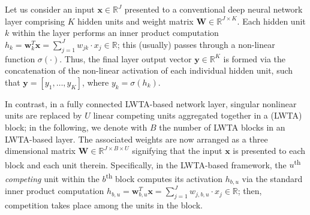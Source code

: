 \documentclass{article}
\begin{document}
	
	Let us consider an input $\boldsymbol x\in \mathbb{R}^{J}$ presented to a conventional deep neural network layer comprising $K$ hidden units and weight matrix $\boldsymbol W \in \mathbb{R}^{J \times K}$. Each hidden unit $k$ within the layer performs an inner product computation $h_k=\boldsymbol w_k^T \boldsymbol x =\sum_{j=1}^J w_{jk} \cdot x_j \in \mathbb{R}$; this (usually) passes through a  non-linear function $\sigma(\cdot)$. Thus, the final layer output vector $\boldsymbol y \in \mathbb{R}^K$ is formed via the concatenation of the non-linear activation of each individual hidden unit, such that  $ \boldsymbol y = [y_1,\dots, y_K]$, where $y_k = \sigma(h_k)$. 
	
	In contrast, in a fully connected LWTA-based network layer, singular nonlinear units are replaced by $U$ linear competing units aggregated together in a (LWTA) block; in the following, we denote with $B$ the number of LWTA blocks in an LWTA-based layer. The associated weights are now arranged as a three dimensional matrix $\boldsymbol W \in \mathbb{R}^{J \times B \times U}$ signifying that the input $\boldsymbol x$ is presented to each block and each unit therein. Specifically, in the LWTA-based framework, the $u$\textsuperscript{th} \textit{competing} unit within the $b$\textsuperscript{th} block computes its activation $h_{b,u}$ via the standard inner product computation $h_{b,u} = \boldsymbol w_{b,u}^T \boldsymbol x= \sum_{j=1}^J w_{j,b,u} \cdot x_j \in\mathbb{R}$; then, competition takes place among the units in the block. 
	
\end{document}
